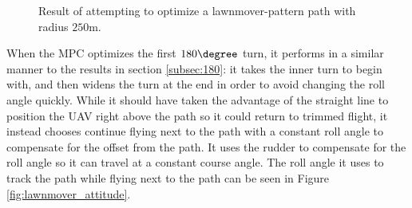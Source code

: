\begin{figure}
	\caption{Result of attempting to optimize a lawnmover-pattern path with radius $250$m.}
	\label{fig:lawnmover}
\end{figure}

When the MPC optimizes the first $180\degree$ turn, it performs in a similar manner to the results in section \ref{subsec:180}: it takes the inner turn to begin with, and then widens the turn at the end in order to avoid changing the roll angle quickly. While it should have taken the advantage of the straight line to position the UAV right above the path so it could return to trimmed flight, it instead chooses continue flying next to the path with a constant roll angle to compensate for the offset from the path. It uses the rudder to compensate for the roll angle so it can travel at a constant course angle. The roll angle it uses to track the path while flying next to the path can be seen in Figure \ref{fig:lawnmover_attitude}.

